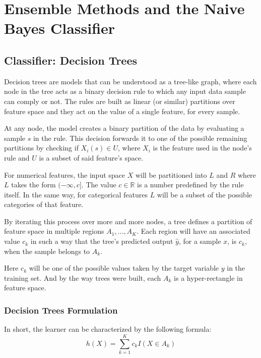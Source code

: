 \chapter{Ensemble Methods and the Naive Bayes Classifier}\label{ch:ensembleMethods}


\section{Classifier: Decision Trees}\label{section:decision_trees}


Decision trees are models that can be understood as a tree-like graph, where each node in the tree acts as a binary decision rule to which any input data sample can comply or not.
The rules are built as linear (or similar) partitions over feature space and they act on the value of a single feature, for every sample.

At any node, the model creates a binary partition of the data by evaluating a sample $s$ in the rule.
This decision forwards it to one of the possible remaining partitions by checking if $X_i(s) \in U$, where $X_i$ is the feature used in the node's rule and $U$ is a subset of said feature's space.

For numerical features, the input space $X$ will be partitioned into $L$ and $R$ where $L$ takes the form $(-\infty,c]$. The value $c \in \mathbb{R}$ is a number predefined by the rule itself.
In the same way, for categorical features $L$ will be a subset of the possible categories of that feature.

By iterating this process over more and more nodes, a tree defines a partition of feature space in multiple regions $A_1,\ldots,A_K$.
Each region will have an associated value $c_k$ in such a way that the tree's predicted output $\hat{y}$, for a sample $x$, is $c_k$, when the sample belongs to $A_k$.

Here $c_k$ will be one of the possible values taken by the target variable $y$ in the training set.
And by the way trees were built, each $A_k$ is a hyper-rectangle in feature space.

\subsection{Decision Trees Formulation}\label{subsection:decision_trees_formulation}
In short, the learner can be characterized by the following formula:
\begin{equation}
\label{eq:decisionTreeModel}
h(X) = \sum_{k=1}^K c_k I(X \in A_k)
\end{equation}

